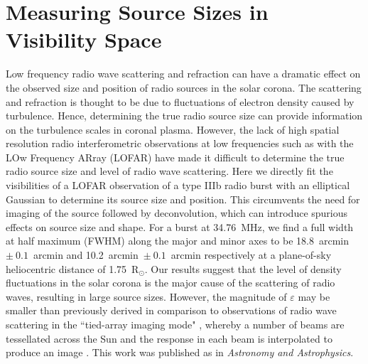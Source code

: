 \doublespacing
\chapter{Measuring Source Sizes in Visibility Space}
\label{chap:measuring_source_sizes}

Low frequency radio wave scattering and refraction can have a dramatic effect on the observed size and position of radio sources in the solar corona.
The scattering and refraction is thought to be due to fluctuations of electron density caused by turbulence. Hence, determining the true radio source size can provide information on the turbulence scales in coronal plasma.
However, the lack of high spatial resolution radio interferometric observations at low frequencies such as with the LOw Frequency ARray (LOFAR) have made it difficult to determine the true radio source size and level of radio wave scattering.
Here we directly fit the visibilities of a LOFAR observation of a type IIIb radio burst with an elliptical Gaussian to determine its source size and position. This circumvents the need for imaging of the source followed by deconvolution, which can introduce spurious effects on source size and shape.
For a burst at 34.76~MHz, we find a full width at half maximum (FWHM) along the major and minor axes to be 18.8~arcmin~$\pm~0.1$~arcmin and 10.2~arcmin~$\pm~0.1$~arcmin respectively at a plane-of-sky heliocentric distance of 1.75~R$_\odot$.
Our results suggest that the level of density fluctuations in the solar corona  is  the  major  cause  of  the  scattering  of  radio  waves, resulting in  large  source  sizes. However, the magnitude of $\varepsilon$ may be smaller than previously derived in comparison to observations of radio wave scattering in the ``tied-array imaging mode" \citep{Morosan2014},	 whereby a number of beams are tessellated across the Sun and the response in each beam is interpolated to produce an image \citep[e.g.][]{Reid2017,Kontar2017,Zucca2018, Morosan2019}. This work was published as \cite{Murphy2021} in \textit{Astronomy and Astrophysics}.

